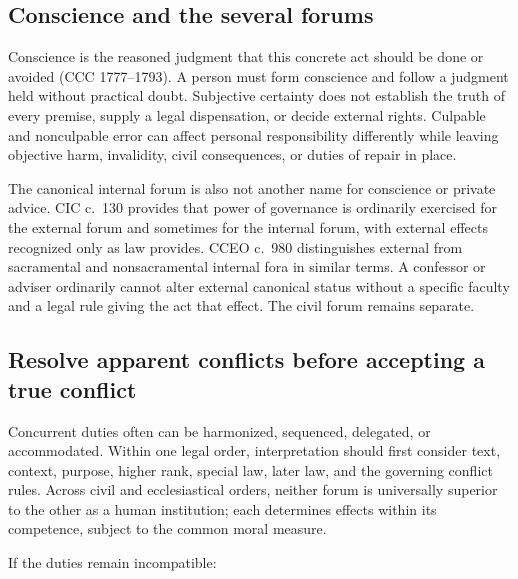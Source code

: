\subsection{Conscience and the several forums}

Conscience is the reasoned judgment that this concrete act should be done or avoided (CCC 1777--1793). A person must form conscience and follow a judgment held without practical doubt. Subjective certainty does not establish the truth of every premise, supply a legal dispensation, or decide external rights. Culpable and nonculpable error can affect personal responsibility differently while leaving objective harm, invalidity, civil consequences, or duties of repair in place.

The canonical internal forum is also not another name for conscience or private advice. CIC c.~130 provides that power of governance is ordinarily exercised for the external forum and sometimes for the internal forum, with external effects recognized only as law provides. CCEO c.~980 distinguishes external from sacramental and nonsacramental internal fora in similar terms. A confessor or adviser ordinarily cannot alter external canonical status without a specific faculty and a legal rule giving the act that effect. The civil forum remains separate.

\subsection{Resolve apparent conflicts before accepting a true conflict}

Concurrent duties often can be harmonized, sequenced, delegated, or accommodated. Within one legal order, interpretation should first consider text, context, purpose, higher rank, special law, later law, and the governing conflict rules. Across civil and ecclesiastical orders, neither forum is universally superior to the other as a human institution; each determines effects within its competence, subject to the common moral measure.

If the duties remain incompatible:

